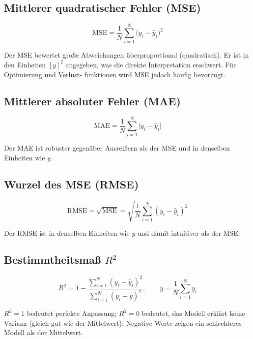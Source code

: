 \documentclass[11pt,a4paper]{report}
\begin{document}
\subsection{Mittlerer quadratischer Fehler (MSE)}

\begin{equation}
\mathrm{MSE} = \frac{1}{N}\sum_{i=1}^{N}\bigl(y_i - \hat{y}_i\bigr)^2
\label{eq:mse}
\end{equation}

Der MSE bewertet gro\ss{}e Abweichungen \"{u}berproportional (quadratisch). Er ist in den Einheiten
$[y]^2$ angegeben, was die direkte Interpretation erschwert. F\"{u}r Optimierung und Verlust-
funktionen wird MSE jedoch h\"{a}ufig bevorzugt.

\subsection{Mittlerer absoluter Fehler (MAE)}

\begin{equation}
\mathrm{MAE} = \frac{1}{N}\sum_{i=1}^{N}\bigl|y_i - \hat{y}_i\bigr|
\label{eq:mae}
\end{equation}

Der MAE ist robuster gegen\"{u}ber Ausrei\ss{}ern als der MSE und in denselben Einheiten wie $y$.

\subsection{Wurzel des MSE (RMSE)}

\begin{equation}
\mathrm{RMSE} = \sqrt{\mathrm{MSE}} = \sqrt{\frac{1}{N}\sum_{i=1}^{N}(y_i-\hat{y}_i)^2}
\end{equation}

Der RMSE ist in denselben Einheiten wie $y$ und damit intuitiver als der MSE.

\subsection{Bestimmtheitsma\ss{} $R^2$}

\begin{equation}
R^2 = 1 - \frac{\sum_{i=1}^{N}(y_i-\hat{y}_i)^2}{\sum_{i=1}^{N}(y_i-\bar{y})^2},
\qquad \bar{y} = \frac{1}{N}\sum_{i=1}^N y_i
\label{eq:r2}
\end{equation}

$R^2 = 1$ bedeutet perfekte Anpassung; $R^2 = 0$ bedeutet, das Modell erkl\"{a}rt keine Varianz
(gleich gut wie der Mittelwert). Negative Werte zeigen ein schlechteres Modell als der Mittelwert.
\end{document}
